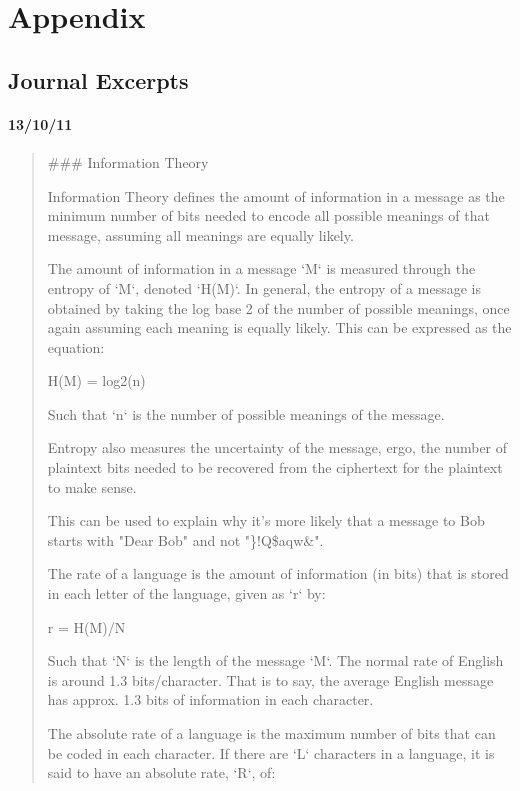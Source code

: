 \documentclass[12pt, a4paper, draft]{report}
\begin{document}
\section*{Appendix}

\subsection*{Journal Excerpts}

\paragraph*{13/10/11}
\begin{quote}
\#\#\# Information Theory

Information Theory defines the amount of information in a message as the minimum number of
bits needed to encode all possible meanings of that message, assuming all meanings are equally likely.

The amount of information in a message `M` is measured through the
entropy of `M`, denoted `H(M)`. In general, the entropy of a message is obtained by taking the log base 2 of the number of possible meanings, once again assuming each meaning is equally likely. This can be expressed as the equation:

    H(M) = log2(n)

Such that `n` is the number of possible meanings of the message.

Entropy also measures the uncertainty of the message, ergo, the number of
plaintext bits needed to be recovered from the ciphertext for the plaintext to make sense.

This can be used to explain why it's more likely that a message to Bob starts
with "Dear Bob" and not "\}!Q\$aqw\&".

The rate of a language is the amount of information (in bits) that is stored in
each letter of the language, given as `r` by:

    r = H(M)/N

Such that `N` is the length of the message `M`. The normal rate of English is around
1.3 bits/character. That is to say, the average English message has approx. 1.3 bits of information in each character.

The absolute rate of a language is the maximum number of bits that can be
coded in each character. If there are `L` characters in a language, it is said to have an absolute rate, `R`, of:


\end{quote}
\end{document}

